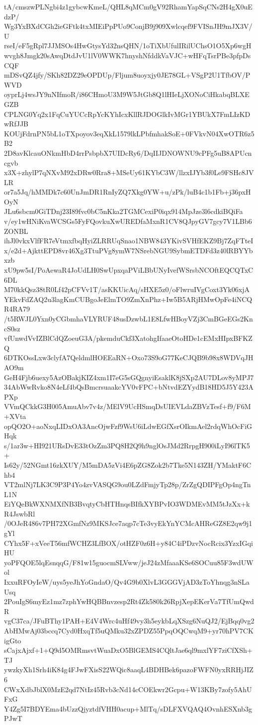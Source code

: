 tA/cmszwPLNgbi4z1gybcwKmeL/QHL8qMCm0gV92RhamYapSqCNs2H4gX0uEdzP/
Wg3YxBXdCGh2ieGFtk4txMIEiPpPUo9ConjB9j909Xwlcqef9FVISnJH9mJX3V/U
rseI/eF5gRpl7JJMSOs4HwGtysYd32nsQHN/1oTiXbUfulIRilUChsO1O5Xp6wgH
wvgh8Jmgk20sAwqDtdJvU1lV0WWK7hnyshNfddkVaVJC+wHFqTsrPBe3pfpDsCQF
mDSvQZ4jfy/SKh82DZ29eOPDUp/Fljum8uoyxjy0JE78GL+VSgP2U1TfbOV/PWVD
oyprLj4wsJY9nNIfmoR/i86CHmoU3M9W5JtGb8Q1lHIeLjXONoCiHkabqBLXEGZB
CPLNG0Yq2x1FqCuYUCcRpYcKYhIcxKllRJDOGlkIvMGr1YBUkX7FmLIzKDwRfJJB
KOUjFdrnPN5bL1oTXpoyov3eqXkL1579lkLPbfmhakSoE+0FVkvN04XwOTR6z5B2
2D8avKlcauONkmHbD4rrPsbpbX7UIDcRy6/DqIIJDNOWNU9cPFg5uB8APUcncgvb
x3X+zhylP7qNXvM92xDRw0Rra8+MSeUy61KYbC3W/llzxIJYb3f0Le9FSHc8JVLR
or7a5Jq/hMMDk7c60UnJmDR1RnIyZQ7Xkg0YW+u/zPk/luB4c1b1Fb+j36pxHOyN
JLu6sbcm0GiTDnj23I89fvc0bC5nKka2TGMCexiP0iqx914MpJze3l6cdkiBQiFa
v/ey1wHNiKvaWCSGs5FyFQovkuXwUREDfaMxnR1CV8QJpyGV7gcy7V1LBb6ZONBL
ihJl0vkxVlfFR7eVtmxfbqHyiZLRRUqSnao1NBW843YKivSVHfEKZ9Bj7ZqFTteI
x/e2d+AjkttEPD8vr46Xg3TtuPVg8ymW7NSrebNGU9SybmETDFd3z40lRBYYbxzb
xU9pw5sI/PoAewaR4JoUdLH0SwUpxqaPViLBbUNyIvefWSrsbNCOftEQCQTxC6DL
M70kkQsz38tR0Lf42pCFVv1T/asKKUicAq/sHXE5z0/oFlwruIVgCoxt3Yk06xjA
YEkvFdZAQ2u3lagKmCUBgoJeElmTO9ZmXnPhz+Iw5B5ARjHMwOpFe4iNCQR4RA79
/t5RWJL0Yxn0yCGbmhaVLYRUF48usDzwbL1E8LfwHBoyVZj3CmBGeEGs2KncS0sz
vfUnwdVvIZBlCdQZoeuG3A/pkemduCkf3XatohgIfaaeOtoHDe1cEMxHIpxBFKZQ
6DTKOssLxw3clyfA7QeldmlHOEEaRN+Oxo73S9oG77KeCJQB9b98x8WDVqJHAO9m
GeH4Fjb6uexy5AzOBakjKIZ4xm1I7eG5sGQgnyiEsaklK8jSXp2AU7DLov8yMPJ7
34AbWwRvko8N4eLf4bQsBmcrsuaakcYV0vFPC+bNtvdEZYydB18HD5J5Y423APXp
VVmQCkkG3H005AmuAbv7v4z/MElV9UcHSmqDsUIEVLdaZBVzTesf+f9/F6M+XVta
opQO2O+aoNxqLIDxOA3AncOjwFzf9WsU6iLdwEGfXsrOIkmAel2rdqWhOcFiGHqk
s/1ar3w+HI921URsDvE33tOzZm3PQ8H2Q9h9nglOsJMd2RrpgH900iLyI96lTK5+
Is62y/52NGmt16zkXUY/M5mDA5zVi4E6pZG8Zok2b7Tke5N143ZH/YMaktF6Chb4
VT2mlNj7LK3C9P3P4Yo4zvVASQG9ou0LZdFmjyTp28p/ZrZgQDIPFgOp4ngTnL1N
EiYQeBkWXNMXfNB3BvqtyCbHTHnqsBIfkXYBPvIO3WDMEvMM5tJzXx+kR4JswbRl
/0OJeR486v7PH72XGmfNz9MKSJce7aqp7cTe3vyEkYnYCMcAHReGZ8E2qw9j1gYl
CYhx5F+xVeeT56mfWCHZ3LfBOX/otHZF0z6H+y84C4iPDzvNocRcix3YzxIGqiHU
yoPFQOE5lqEsnqqG/F81w15guocmSLVww/jeJ24zMfaaaKSe6SOCuu85F3wdUWol
IxxuRFOyIeW/uys5yeJhYoGndaO/Qv4G9b0XlvL3GGGVjAD3zToYhnqg3nSLaUsq
2PouIgS6myEz1mz7zphYwHQBBnvzesp2Rt4Zk580k26RpjXepEKerVa7TfUmQwdR
vgC37ca/JFuBThy1PAH+E4V4Wrc4uHf49vy3h5eykbLqXSzg6NuQJ2/EjBqq0vg2
AbHMwAj03bccq7Cyd0HxqTf5uQMku32xZPDZ55PpqOQCwqM9+yr70hPV7CKigGto
sCajxAjxf+1+Q9d5OMRmsvtWuaDxO5BlGEMS4CQltJae6ql9mxlYF7ziCfXSh+TJ
ywzkyXh1Srh4iK84g4FJwFXisS22WQic8aaqL4BDHBek6pazoFWFN0yxRRHjJIZ6
CWxXdbJblX0MzE2qd7NtIz45Rvb3cNd14cCOEkwr2Gcpu+W13KBy7zofy5AhUFxG
Y4Zg5I7BDYEma4bUzzQjyztdfVHH0acup+MlTq/sDLFXVQAQ4OvnhESXnb3gPJwT

